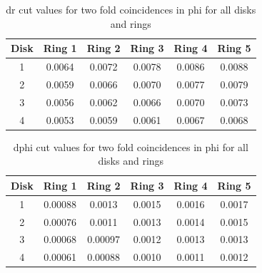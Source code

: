 \begin{table}[h]
  \centering
  \caption[dr cut values]{dr cut values for two fold coincidences in phi for all disks and rings}
  \begin{tabular}{cccccc}
    \textbf{Disk} & \textbf{Ring 1} & \textbf{Ring 2} & \textbf{Ring 3} & \textbf{Ring 4} & \textbf{Ring 5} \\
    \hline
    1  & 0.0064 & 0.0072  & 0.0078 & 0.0086 & 0.0088 \\
    2  & 0.0059 & 0.0066 & 0.0070 & 0.0077 & 0.0079 \\
    3  & 0.0056 & 0.0062 & 0.0066 & 0.0070  & 0.0073 \\
    4  & 0.0053  & 0.0059 & 0.0061  & 0.0067 & 0.0068 \\
  \end{tabular}
  \label{tab:disk_values}
\end{table}



\begin{table}[h]
  \centering
  \caption[dphi cut values]{dphi cut values for two fold coincidences in phi for all disks and rings}
  \begin{tabular}{cccccc}
    \textbf{Disk} & \textbf{Ring 1} & \textbf{Ring 2} & \textbf{Ring 3} & \textbf{Ring 4} & \textbf{Ring 5} \\
    \hline
    1  & 0.00088  & 0.0013   & 0.0015    & 0.0016   & 0.0017   \\
    2  & 0.00076   & 0.0011   & 0.0013   & 0.0014   & 0.0015   \\
    3  & 0.00068  & 0.00097  & 0.0012   & 0.0013   & 0.0013   \\
    4  & 0.00061  & 0.00088  & 0.0010   & 0.0011   & 0.0012   \\
  \end{tabular}
  \label{tab:mdphi_cuts_values}
\end{table}

